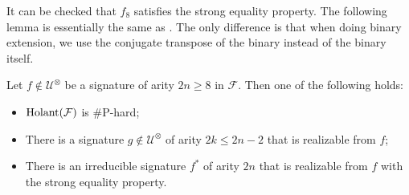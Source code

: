 It can be checked that $f_8$ satisfies the strong equality property.
The following lemma is essentially the same as
\cite[Lemma~8.1]{realholant}.
The only difference is that when doing binary extension, we use the conjugate transpose of the binary instead of the binary itself.

\begin{lemma}
\label{lm: unitary wire normalization}
Let $f\notin \mathcal{U}^\otimes$ be a signature of arity $2n\ge 8$ in $\mathcal{F}$.
Then one of the following holds:
\begin{itemize}
    \item $\operatorname{Holant}(\mathcal{F})$ is \#P-hard;
    \item There is a signature $g\notin \mathcal{U}^\otimes$ of arity $2k\le 2n-2$ that is realizable from $f$;
    \item There is an irreducible signature $f^\ast$ of arity $2n$ that is realizable from $f$ with the strong equality property.
\end{itemize}
\end{lemma}


